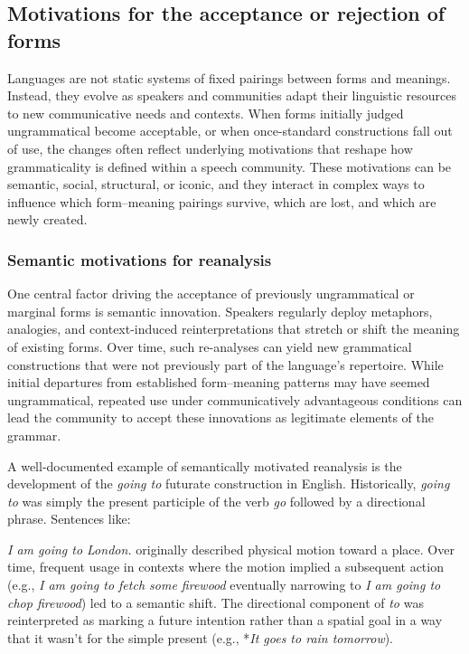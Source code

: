 \subsection{Motivations for the acceptance or rejection of forms}\label{sec:motivations}

Languages are not static systems of fixed pairings between forms and meanings. Instead, they evolve as speakers and communities adapt their linguistic resources to new communicative needs and contexts. When forms initially judged ungrammatical become acceptable, or when once-standard constructions fall out of use, the changes often reflect underlying motivations that reshape how grammaticality is defined within a speech community. These motivations can be semantic, social, structural, or iconic, and they interact in complex ways to influence which form--meaning pairings survive, which are lost, and which are newly created.

\subsubsection{Semantic motivations for reanalysis}\label{subsec:semantic-motivations}

One central factor driving the acceptance of previously ungrammatical or marginal forms is semantic innovation. Speakers regularly deploy metaphors, analogies, and context-induced reinterpretations that stretch or shift the meaning of existing forms. Over time, such re-analyses can yield new grammatical constructions that were not previously part of the language’s repertoire. While initial departures from established form--meaning patterns may have seemed ungrammatical, repeated use under communicatively advantageous conditions can lead the community to accept these innovations as legitimate elements of the grammar.


A well-documented example of semantically motivated reanalysis is the development of the \textit{going to} futurate construction in English. Historically, \textit{going to} was simply the present participle of the verb \textit{go} followed by a directional phrase. Sentences like:

\ea
\textit{I am going to London.}
\z
originally described physical motion toward a place. Over time, frequent usage in contexts where the motion implied a subsequent action (e.g., \textit{I am going to fetch some firewood} eventually narrowing to \textit{I am going to chop firewood}) led to a semantic shift. The directional component of \textit{to} was reinterpreted as marking a future intention rather than a spatial goal in a way that it wasn't for the simple present (e.g., *\textit{It goes to rain tomorrow}).

